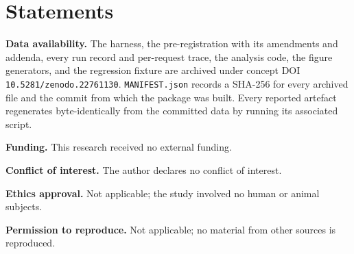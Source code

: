 \documentclass{ieeeaccess}
\begin{document}
\section*{Statements}

{\bfseries Data availability.} The harness, the pre-registration with its amendments and addenda, every run record and per-request trace, the analysis code, the figure generators, and the regression fixture are archived under concept DOI \texttt{10.5281/zenodo.22761130}. \texttt{MANIFEST.json} records a SHA-256 for every archived file and the commit from which the package was built. Every reported artefact regenerates byte-identically from the committed data by running its associated script.

{\bfseries Funding.} This research received no external funding.

{\bfseries Conflict of interest.} The author declares no conflict of interest.

{\bfseries Ethics approval.} Not applicable; the study involved no human or animal subjects.

{\bfseries Permission to reproduce.} Not applicable; no material from other sources is reproduced.
\end{document}
